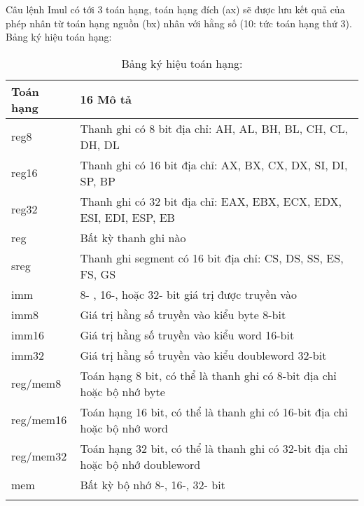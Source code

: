 	Câu lệnh Imul có tới 3 toán hạng, toán hạng đích (ax) sẽ được lưu kết quả của phép nhân từ toán hạng nguồn (bx) nhân với hằng số (10: tức toán hạng thứ 3).\\
	Bảng ký hiệu toán hạng:
	\begin{longtable}{ | m{3cm} | m{12cm} | }
			\hline
				Toán hạng & 16 Mô tả\\
			\hline
			\hline
				reg8 & Thanh ghi có 8 bit địa chỉ: AH, AL, BH, BL, CH, CL, DH, DL \\
			\hline			
				reg16& Thanh ghi có 16 bit địa chỉ: AX, BX, CX, DX, SI, DI, SP, BP\\
			\hline		
				reg32& Thanh ghi có 32 bit địa chỉ: EAX, EBX, ECX, EDX, ESI, EDI, ESP, EB\\
			\hline	
				reg&	Bất kỳ thanh ghi nào\\
			\hline	
				sreg & Thanh ghi segment có 16 bit địa chỉ: CS, DS, SS, ES, FS, GS\\
			\hline	
				imm	&8- , 16-, hoặc 32- bit giá trị được truyền vào\\
			\hline	
				imm8	& Giá trị hằng số truyền vào kiểu byte 8-bit\\
			\hline	
				imm16	& Giá trị hằng số truyền vào kiểu word 16-bit\\
			\hline	
				imm32&	Giá trị hằng số truyền vào kiểu doubleword 32-bit\\
			\hline	
				reg/mem8& Toán hạng 8 bit, có thể là thanh ghi có 8-bit địa chỉ hoặc bộ nhớ byte\\
			\hline	
				reg/mem16&	Toán hạng 16 bit, có thể là thanh ghi có 16-bit địa chỉ hoặc bộ nhớ word\\
			\hline	
				reg/mem32	& Toán hạng 32 bit, có thể là thanh ghi có 32-bit địa chỉ hoặc bộ nhớ doubleword\\
			\hline	
				mem	& Bất kỳ bộ nhớ 8-, 16-, 32- bit\\
		\hline	
			\caption{Bảng ký hiệu toán hạng:}
			\label{table:tbkyhieu}
	\end{longtable}
	
